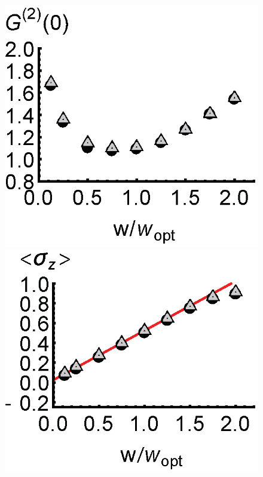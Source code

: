 \documentclass[aps,
twocolumn,
showpacs,
superscriptaddress,groupedaddress]{revtex4}
\begin{document}
\begin{figure}
\begin{center}
	\hspace{-5.0mm} \includegraphics[scale =0.38] {N40SuperradianceG2.eps}\\ \vspace{0mm}
	\includegraphics[scale =0.38] {N40CrossoverSZ.eps}

\end{center}
\end{figure}
\end{document}
